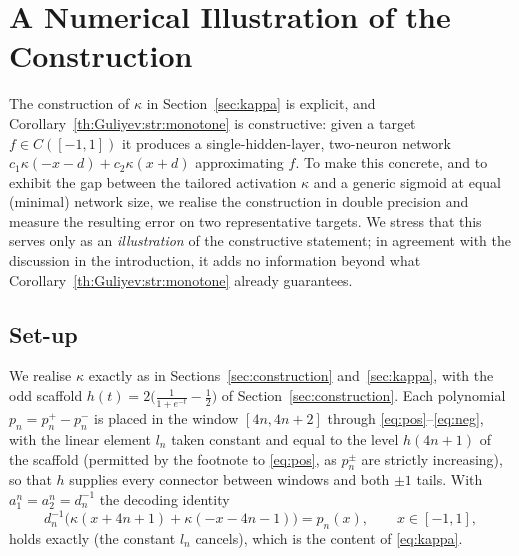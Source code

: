 \section{A Numerical Illustration of the Construction}\label{sec:experiments}

The construction of $\kappa$ in Section~\ref{sec:kappa} is explicit, and
Corollary~\ref{th:Guliyev:str:monotone} is constructive: given a target
$f\in C([-1,1])$ it produces a single-hidden-layer, two-neuron network
$c_1\kappa(-x-d)+c_2\kappa(x+d)$ approximating $f$. To make this concrete, and to
exhibit the gap between the tailored activation $\kappa$ and a generic sigmoid at
equal (minimal) network size, we realise the construction in double precision and
measure the resulting error on two representative targets. We stress that this
serves only as an \emph{illustration} of the constructive statement; in agreement
with the discussion in the introduction, it adds no information beyond what
Corollary~\ref{th:Guliyev:str:monotone} already guarantees.

\subsection{Set-up}

We realise $\kappa$ exactly as in Sections~\ref{sec:construction}
and~\ref{sec:kappa}, with the odd scaffold
$h(t)=2\big(\tfrac{1}{1+e^{-t}}-\tfrac12\big)$ of Section~\ref{sec:construction}.
Each polynomial $p_n=p_n^{+}-p_n^{-}$ is placed in the window $[4n,4n+2]$ through
\eqref{eq:pos}--\eqref{eq:neg}, with the linear element $l_n$ taken constant and
equal to the level $h(4n+1)$ of the scaffold (permitted by the footnote to
\eqref{eq:pos}, as $p_n^{\pm}$ are strictly increasing), so that $h$ supplies
every connector between windows and both $\pm1$ tails. With $a_1^{n}=a_2^{n}=d_n^{-1}$
the decoding identity
\begin{equation}\label{eq:decode-num}
  d_n^{-1}\Big(\kappa(x+4n+1)+\kappa(-x-4n-1)\Big)=p_n(x),\qquad x\in[-1,1],
\end{equation}
holds exactly (the constant $l_n$ cancels), which is the content of
\eqref{eq:kappa}.

